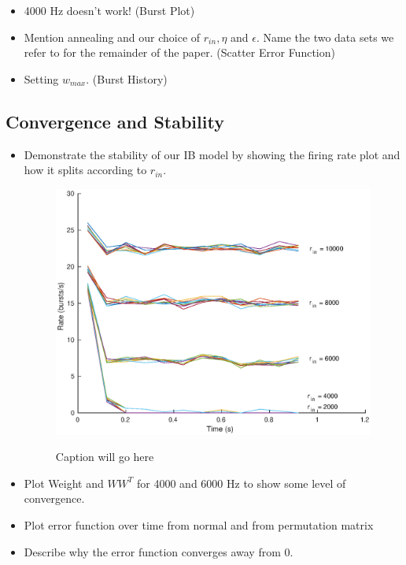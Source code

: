 \documentclass[12pt, final]{article}
\begin{document}
\begin{itemize}
\item 4000 Hz doesn't work! (Burst Plot)

\item Mention annealing and our choice of \(r_{in}, \eta\) and \(\epsilon\). Name the two data sets we refer to for the remainder of the paper. (Scatter Error Function)

\item Setting \(w_{max}\). (Burst History)
\end{itemize}

\subsection{Convergence and Stability}

\begin{itemize}
\item Demonstrate the stability of our IB model by showing the firing rate plot and how it splits according to \(r_{in}\).

\begin{figure}[H]
\centering
\includegraphics[scale = 0.4]{Firing_Rate_Binsize_80ms.eps}
\label{FR}
\caption{Caption will go here}
\end{figure}

\item Plot Weight and \(WW^T\) for 4000 and 6000 Hz to show some level of convergence.

\item Plot error function over time from normal and from permutation matrix

\item Describe why the error function converges away from 0.
\end{itemize}
\end{document}
